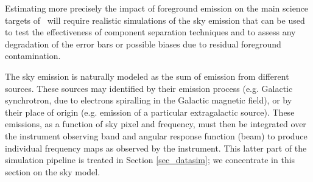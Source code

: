 
Estimating more precisely the impact of foreground emission on the main science targets of \cmbexp\ will require realistic simulations of the sky emission that can be used to test the effectiveness of component separation techniques and to assess any degradation of the error bars or possible biases due to residual foreground contamination. 

The sky emission is naturally modeled as the sum of emission from different sources. These sources may identified by their emission process (e.g. Galactic synchrotron, due to electrons spiralling in the Galactic magnetic field), or by their place of origin (e.g. emission of a particular extragalactic source). These emissions, as a function of sky pixel and frequency, must then be integrated over the instrument observing band and angular response function (beam) to produce individual frequency maps as observed by the instrument. 
This latter part of the simulation pipeline is treated in Section \ref{sec_datasim}; we concentrate in this section on the sky model.


